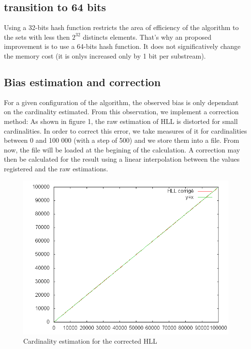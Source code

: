\documentclass{article}
\begin{document}
\subsection{transition to 64 bits}
Using a 32-bits hash function restricts the area of efficiency of the
algorithm to the sets with less then $2^{32}$ distincts elements.
That's why an proposed improvement is to use a 64-bits hash function.
It does not significatively change the memory cost (it is
onlys increased only by 1 bit per substream).

\subsection{Bias estimation and correction}
For a given configuration of the algorithm, the observed bias is only
dependant on the cardinality estimated. From this observation, we
implement a correction method: As shown in figure 1, the raw
estimation of HLL is distorted for small cardinalities. In order to
correct this error, we take measures of it for cardinalities between 0
and 100 000 (with a step of 500) and we store them into a file. From
now, the file will be loaded at the begining of the calculation. A
correction may then be calculated for the result using a linear
interpolation between the values registered and the raw estimations.

\begin{center}
\begin{figure}[h]
\includegraphics[scale=0.7]{img02.png}
\caption{Cardinality estimation for the corrected HLL}
\end{figure}
\end{center}
\end{document}
